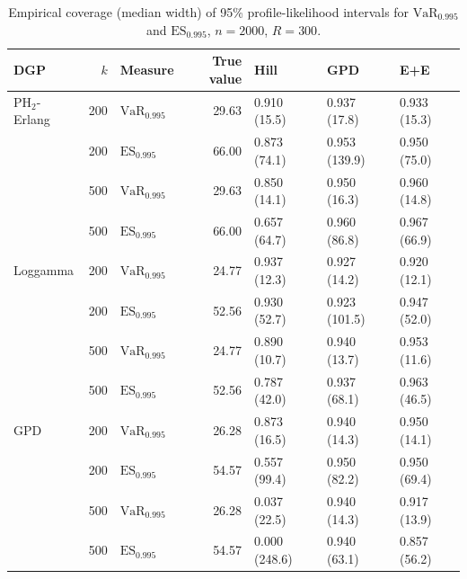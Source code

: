 \begin{table}[t]
\centering
\footnotesize
\setlength{\tabcolsep}{4pt}
\caption{Empirical coverage (median width) of 95\% profile-likelihood intervals for $\mathrm{VaR}_{0.995}$ and $\mathrm{ES}_{0.995}$, $n=2000$, $R=300$.}
\label{tab:covrisk}
\begin{tabular}{lrlrlll}
\toprule
DGP & $k$ & Measure & True value & Hill & GPD & E+E \\
\midrule
PH$_2$-Erlang & 200 & $\mathrm{VaR}_{0.995}$ & 29.63 & 0.910 (15.5) & 0.937 (17.8) & 0.933 (15.3) \\
 & 200 & $\mathrm{ES}_{0.995}$ & 66.00 & 0.873 (74.1) & 0.953 (139.9) & 0.950 (75.0) \\
 & 500 & $\mathrm{VaR}_{0.995}$ & 29.63 & 0.850 (14.1) & 0.950 (16.3) & 0.960 (14.8) \\
 & 500 & $\mathrm{ES}_{0.995}$ & 66.00 & 0.657 (64.7) & 0.960 (86.8) & 0.967 (66.9) \\
\midrule
Loggamma & 200 & $\mathrm{VaR}_{0.995}$ & 24.77 & 0.937 (12.3) & 0.927 (14.2) & 0.920 (12.1) \\
 & 200 & $\mathrm{ES}_{0.995}$ & 52.56 & 0.930 (52.7) & 0.923 (101.5) & 0.947 (52.0) \\
 & 500 & $\mathrm{VaR}_{0.995}$ & 24.77 & 0.890 (10.7) & 0.940 (13.7) & 0.953 (11.6) \\
 & 500 & $\mathrm{ES}_{0.995}$ & 52.56 & 0.787 (42.0) & 0.937 (68.1) & 0.963 (46.5) \\
\midrule
GPD & 200 & $\mathrm{VaR}_{0.995}$ & 26.28 & 0.873 (16.5) & 0.940 (14.3) & 0.950 (14.1) \\
 & 200 & $\mathrm{ES}_{0.995}$ & 54.57 & 0.557 (99.4) & 0.950 (82.2) & 0.950 (69.4) \\
 & 500 & $\mathrm{VaR}_{0.995}$ & 26.28 & 0.037 (22.5) & 0.940 (14.3) & 0.917 (13.9) \\
 & 500 & $\mathrm{ES}_{0.995}$ & 54.57 & 0.000 (248.6) & 0.940 (63.1) & 0.857 (56.2) \\
\bottomrule
\end{tabular}
\end{table}
